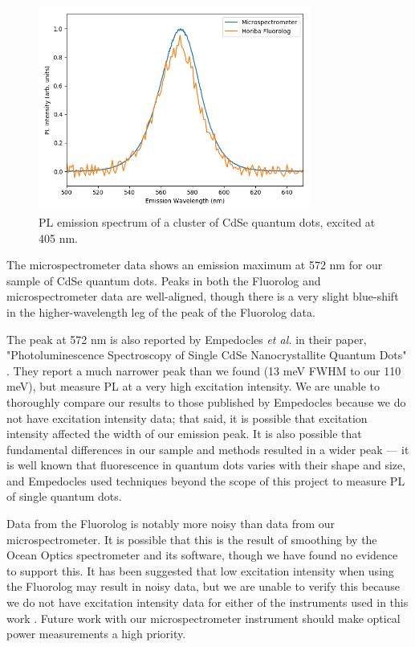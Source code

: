 \begin{figure}[H]
    \centering
    \includegraphics[width=0.8\textwidth]{./img/qd-2.png}
    \caption{PL emission spectrum of a cluster of CdSe quantum dots, excited at 405 nm.}
    \label{fig:pl-adt-qd}
\end{figure}

The microspectrometer data shows an emission maximum at 572 nm for our sample of CdSe quantum dots. Peaks in both the Fluorolog and microspectrometer data are well-aligned, though there is a very slight blue-shift in the higher-wavelength leg of the peak of the Fluorolog data. 

The peak at 572 nm is also reported by Empedocles \emph{et al.} in their paper, "Photoluminescence Spectroscopy of Single CdSe Nanocrystallite Quantum Dots" \cite{empedocles_photoluminescence_1996}. They report a much narrower peak than we found (13 meV FWHM to our 110 meV), but measure PL at a very high excitation intensity. We are unable to thoroughly compare our results to those published by Empedocles because we do not have excitation intensity data; that said, it is possible that excitation intensity affected the width of our emission peak. It is also possible that fundamental differences in our sample and methods resulted in a wider peak --- it is well known that fluorescence in quantum dots varies with their shape and size, and Empedocles used techniques beyond the scope of this project to measure PL of single quantum dots.

Data from the Fluorolog is notably more noisy than data from our microspectrometer. It is possible that this is the result of smoothing by the Ocean Optics spectrometer and its software, though we have found no evidence to support this. It has been suggested that low excitation intensity when using the Fluorolog may result in noisy data, but we are unable to verify this because we do not have excitation intensity data for either of the instruments used in this work \cite{minot-private}. Future work with our microspectrometer instrument should make optical power measurements a high priority.
